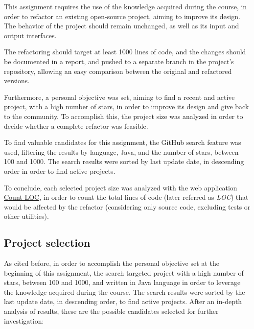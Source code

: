 This assignment requires the use of the knowledge acquired during the course, in order to refactor an existing open-source project, aiming to improve its design. The behavior of the project should remain unchanged, as well as its input and output interfaces.

The refactoring should target at least 1000 lines of code, and the changes should be documented in a report, and pushed to a separate branch in the project's repository, allowing an easy comparison between the original and refactored versions.

Furthermore, a personal objective was set, aiming to find a recent and active project, with a high number of stars, in order to improve its design and give back to the community. To accomplish this, the project size was analyzed in order to decide whether a complete refactor was feasible.

To find valuable candidates for this assignment, the GitHub search feature was used, filtering the results by language, Java, and the number of stars, between 100 and 1000. The search results were sorted by last update date, in descending order in order to find active projects.

To conclude, each selected project size was analyzed with the web application \href{https://codetabs.com/count-loc/count-loc-online.html}{Count LOC}, in order to count the total lines of code (later referred as \emph{LOC}) that would be affected by the refactor (considering only source code, excluding tests or other utilities).

\subsection{Project selection}

As cited before, in order to accomplish the personal objective set at the beginning of this assignment, the search targeted project with a high number of stars, between 100 and 1000, and written in Java language in order to leverage the knowledge acquired during the course. The search results were sorted by the last update date, in descending order, to find active projects. After an in-depth analysis of results, these are the possible candidates selected for further investigation:

